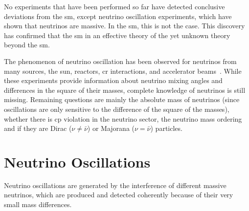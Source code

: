 No experiments that have been performed so far have detected conclusive deviations from the \acrshort{sm}, except neutrino oscillation experiments, which have shown that neutrinos are massive. In the \acrshort{sm}, this is not the case. This discovery has confirmed that the \acrshort{sm} in an effective theory of the yet unknown theory beyond the \acrshort{sm}. 


The phenomenon of neutrino oscillation has been observed for neutrinos from many sources, the sun, reactors, \acrfull{cr} interactions, and accelerator beams~\cite{pdg}. While these experiments provide information about neutrino mixing angles and differences in the square of their masses, complete knowledge of neutrinos is still missing. Remaining questions are mainly the absolute mass of neutrinos (since oscillations are only sensitive to the difference of the square of the masses), whether there is \acrshort{cp} violation in the neutrino sector, the neutrino mass ordering and if they are Dirac ($\nu \neq \bar{\nu}$) or Majorana ($\nu = \bar{\nu}$) particles.



















\section{Neutrino Oscillations}
\label{sec:neutrino_oscillations_vacuum}

Neutrino oscillations are generated by the interference of different massive neutrinos, which are produced and detected coherently because of their very small mass differences. 

